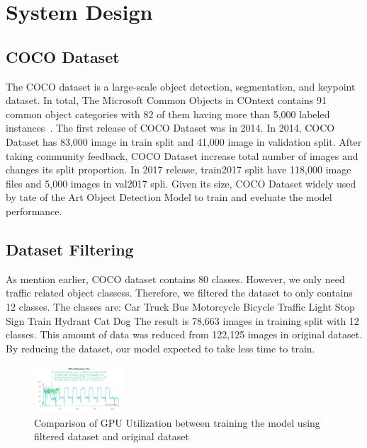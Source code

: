 \documentclass[conference]{IEEEtran}
\begin{document}
\section{System Design}

\subsection{COCO Dataset}\label{AA}
The COCO dataset is a large-scale object detection, segmentation, and keypoint dataset.
In total, The Microsoft Common Objects in COntext contains 91 common object categories with 82 of them having more than 5,000 labeled instances~\cite{COCO Dataset}.
The first release of COCO Dataset was in 2014. In 2014, COCO Dataset has 83,000 image in train split and 41,000 image in validation split.
After taking community feedback, COCO Dataset increase total number of images and changes its split proportion. In 2017 release, train2017 split have 118,000 image files and 5,000 images in val2017 spli.
Given its size, COCO Dataset widely used by tate of the Art Object Detection Model to train and eveluate the model performance.


\subsection{Dataset Filtering}\label{Filtering}
As mention earlier, COCO dataset contains 80 classes. However, we only need traffic related object classess.
Therefore, we filtered the dataset to only contains 12 classes. The classes are:
Car Truck Bus Motorcycle Bicycle Traffic Light Stop Sign Train Hydrant Cat Dog
The result is 78,663 images in training split with 12 classes. This amount of data was reduced from 122,125 images in original dataset. By reducing the dataset, our model expected to take less time to train.


\begin{figure}[h]
\centering
\includegraphics[width=0.3\textwidth,keepaspectratio]{gpu_utilization_comparison_original_and_filtered.png}
\caption{Comparison of GPU Utilization between training the model using filtered dataset and original dataset}
\label{fig:original_filtered_gpu_utilization}
\end{figure}
\end{document}
